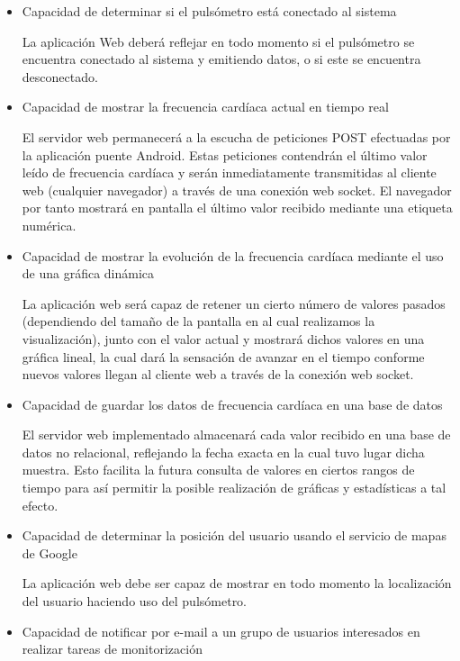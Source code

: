 \begin{itemize}
	
\item Capacidad de determinar si el pulsómetro está conectado al sistema

La aplicación Web deberá reflejar en todo momento si el pulsómetro se encuentra conectado al sistema y emitiendo datos, o si este se encuentra desconectado.

\item Capacidad de mostrar la frecuencia cardíaca actual en tiempo real

El servidor web permanecerá a la escucha de peticiones POST efectuadas por la aplicación puente Android. Estas peticiones contendrán el último valor leído de frecuencia cardíaca y serán inmediatamente transmitidas al cliente web (cualquier navegador) a través de una conexión web socket. El navegador por tanto mostrará en pantalla el último valor recibido mediante una etiqueta numérica.

\item Capacidad de mostrar la evolución de la frecuencia cardíaca mediante el uso de una gráfica dinámica

La aplicación web será capaz de retener un cierto número de valores pasados (dependiendo del tamaño de la pantalla en al cual realizamos la visualización), junto con el valor actual y mostrará dichos valores en una gráfica lineal, la cual dará la sensación de avanzar en el tiempo conforme nuevos valores llegan al cliente web a través de la conexión web socket.

\item Capacidad de guardar los datos de frecuencia cardíaca en una base de datos

El servidor web implementado almacenará cada valor recibido en una base de datos no relacional, reflejando la fecha exacta en la cual tuvo lugar dicha muestra. Esto facilita la futura consulta de valores en ciertos rangos de tiempo para así permitir la posible realización de gráficas y estadísticas a tal efecto.

\item Capacidad de determinar la posición del usuario usando el servicio de mapas de Google

La aplicación web debe ser capaz de mostrar en todo momento la localización del usuario haciendo uso del pulsómetro.

\item Capacidad de notificar por e-mail a un grupo de usuarios interesados en realizar tareas de monitorización


\end{itemize}
